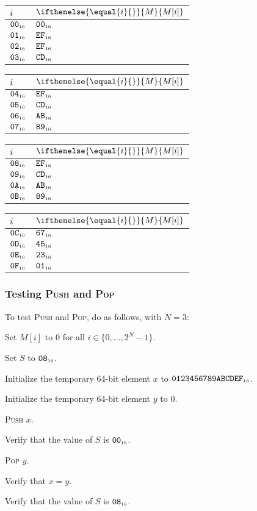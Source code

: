 \documentclass[a4paper,12pt]{article}
\makeatletter
\newcommand{\num}[1]{\texttt{#1}}
\newcommand{\hex}[1]{\num{#1}_{\textup{\tiny 16}}}
\newcommand{\MEM}[1]{\ifthenelse{\equal{#1}{}}{M}{M[#1]}}
\newcommand{\SP}{S}
\newcommand{\range}[2]{\{#1,\ldots,#2\}}
\newcommand{\proc}[1]{\textsc{#1}}
\newenvironment{memtable}{%
  \begin{trivlist}
    \item
    }{%
    \end{trivlist}}
\newenvironment{memcolumn}{%
  \begin{tabular}{@{}ll@{}}
    $i$ & $\MEM{i}$ \\
    \hline}
    {%
    \hline
  \end{tabular}}
\newcommand{\memspace}{\qquad}
\makeatother
\begin{document}
\begin{memtable}
  \begin{memcolumn}
    $\hex{00}$ & $\hex{00}$ \\
    $\hex{01}$ & $\hex{EF}$ \\
    $\hex{02}$ & $\hex{EF}$ \\
    $\hex{03}$ & $\hex{CD}$ \\
  \end{memcolumn}
  \memspace
  \begin{memcolumn}
    $\hex{04}$ & $\hex{EF}$ \\
    $\hex{05}$ & $\hex{CD}$ \\
    $\hex{06}$ & $\hex{AB}$ \\
    $\hex{07}$ & $\hex{89}$ \\
  \end{memcolumn}
  \memspace
  \begin{memcolumn}
    $\hex{08}$ & $\hex{EF}$ \\
    $\hex{09}$ & $\hex{CD}$ \\
    $\hex{0A}$ & $\hex{AB}$ \\
    $\hex{0B}$ & $\hex{89}$ \\
  \end{memcolumn}
  \memspace
  \begin{memcolumn}
    $\hex{0C}$ & $\hex{67}$ \\
    $\hex{0D}$ & $\hex{45}$ \\
    $\hex{0E}$ & $\hex{23}$ \\
    $\hex{0F}$ & $\hex{01}$ \\
  \end{memcolumn}
\end{memtable}

\subsubsection{Testing \proc{Push} and \proc{Pop}}

To test \proc{Push} and \proc{Pop}, do as follows, with $N=3$:
\begin{stepnumbers}
\item Set $M[i]$ to 0 for all $i \in \range{0}{2^N-1}$.
\item Set $\SP$ to $\hex{08}$.
\item Initialize the temporary 64-bit element $x$ to $\hex{0123456789ABCDEF}$.
\item Initialize the temporary 64-bit element $y$ to $0$.
\item \proc{Push} $x$.
\item Verify that the value of $\SP$ is $\hex{00}$.
\item \proc{Pop} $y$.
\item Verify that $x=y$.
\item Verify that the value of $\SP$ is $\hex{08}$.
\end{stepnumbers}
\end{document}
